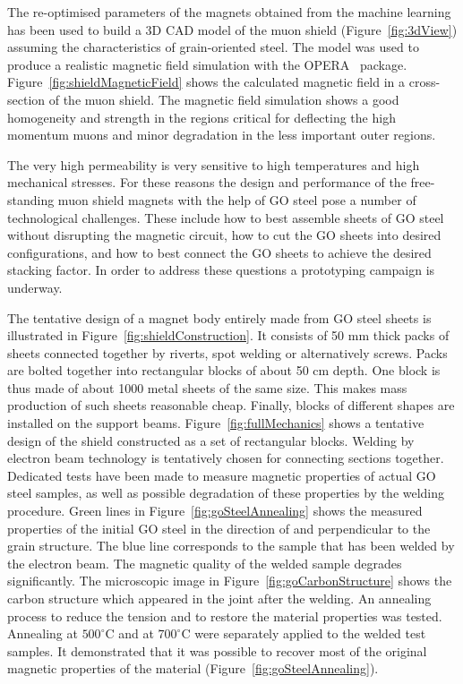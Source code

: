 \documentclass{article}
\begin{document}
The re-optimised parameters of the magnets obtained from the machine learning has been
used to build a 3D CAD model of the muon shield (Figure~\ref{fig:3dView}) assuming the 
characteristics of grain-oriented steel. The model was used to produce a realistic magnetic 
field simulation with the OPERA~\cite{ref:OPERA_magnetic_simulation} package. 
Figure~\ref{fig:shieldMagneticField} shows the calculated magnetic field in a cross-section of
the muon shield. The  magnetic field simulation shows a good homogeneity and strength in 
the regions critical for deflecting the high momentum muons and minor degradation in the
less important outer regions. 

The very high permeability is very sensitive to high temperatures and high mechanical 
stresses. For these reasons the design and performance of the free-standing muon shield 
magnets with the help of GO steel pose a number of technological challenges. These 
include how to best assemble sheets of GO steel without disrupting the magnetic 
circuit, how to cut the GO sheets into desired configurations, and how to best connect the 
GO sheets to achieve the desired stacking factor. In order to address these questions a 
prototyping campaign is underway.

The tentative design of a magnet body entirely made from GO steel sheets is illustrated in 
Figure~\ref{fig:shieldConstruction}. It consists of 50 mm thick packs of sheets connected 
together by riverts, spot welding or alternatively screws. Packs are bolted together into 
rectangular blocks of about 50 cm depth. One block is thus made of about 1000 metal sheets
of the same size. This makes mass production of such sheets reasonable cheap. Finally, 
blocks of different shapes are installed on the support beams.  Figure~\ref{fig:fullMechanics}
shows a tentative design of the shield constructed as a set of rectangular blocks.
Welding by electron beam technology is tentatively chosen for connecting sections together.
Dedicated tests have been made to measure magnetic properties of actual GO steel samples, 
as well as possible degradation of these properties by the welding procedure. Green lines 
in Figure~\ref{fig:goSteelAnnealing} shows the measured properties of the initial GO steel in the direction of and perpendicular to the grain structure. The blue line corresponds to the sample that has been welded by the electron beam. The magnetic 
quality of the welded sample degrades significantly.
The microscopic image in Figure~\ref{fig:goCarbonStructure} shows the carbon structure which 
appeared in the joint after the welding. An annealing process to reduce the tension and to restore the material properties was tested.
Annealing at $500^\circ$C and at $700^\circ$C were separately applied to the welded test 
samples. It demonstrated that it was possible to recover most of the original magnetic 
properties of the material (Figure~\ref{fig:goSteelAnnealing}).
\end{document}
